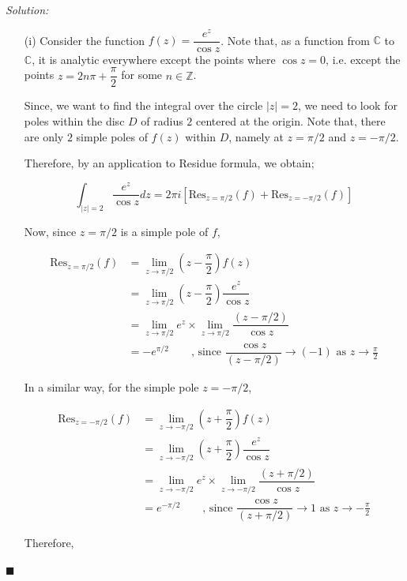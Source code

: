 \documentclass[12pt]{article}
\newcommand{\C}{\mathbb{C}}
\newcommand{\Z}{\mathbb{Z}}
\newcommand{\res}{\text{Res}}
\theoremstyle{definition}
\newenvironment{answer}{\textit{Solution: }\quad }{ \hfill $\blacksquare$}
\numberwithin{equation}{section}
\begin{document}
\begin{answer}
	\begin{enumerate}
		\item[(i)] Consider the function $f(z) = \dfrac{e^z}{\cos z}$. Note that, as a function from $\C$ to $\C$, it is analytic everywhere except the points where $\cos z =0$, i.e. except the points $z = 2n\pi + \dfrac{\pi}{2}$ for some $n \in \Z$. 
		 
		Since, we want to find the integral over the circle $\vert z \vert = 2$, we need to look for poles within the disc $D$ of radius $2$ centered at the origin. Note that, there are only $2$ simple poles of $f(z)$ within $D$, namely at $z = \pi/2$ and $z = -\pi/2$.
		
		Therefore, by an application to Residue formula, we obtain;

		$$
		\int_{\vert z \vert = 2} \dfrac{e^z}{\cos z} dz = 2\pi i\left[\res_{z = \pi/2}(f) + \res_{z = -\pi/2}(f)\right]
		$$

		Now, since $z = \pi/2$ is a simple pole of $f$,

		\begin{align*}
			\res_{z = \pi/2}(f)
			& = \lim_{z \rightarrow \pi/2} \left( z - \dfrac{\pi}{2}\right) f(z)\\
			& = \lim_{z \rightarrow \pi/2} \left( z - \dfrac{\pi}{2}\right) \dfrac{e^z}{\cos z}\\
			& = \lim_{z \rightarrow \pi/2} e^z \times \lim_{z \rightarrow \pi/2} \dfrac{(z - \pi/2)}{\cos z}\\
			& = -e^{\pi/2} \qquad \text{, since } \dfrac{\cos z}{(z - \pi/2)} \rightarrow (-1) \text{ as } z \rightarrow \frac{\pi}{2}
		\end{align*}

		In a similar way, for the simple pole $z = -\pi/2$, 

		\begin{align*}
			\res_{z = -\pi/2}(f)
			& = \lim_{z \rightarrow -\pi/2} \left( z + \dfrac{\pi}{2}\right) f(z)\\
			& = \lim_{z \rightarrow -\pi/2} \left( z + \dfrac{\pi}{2}\right) \dfrac{e^z}{\cos z}\\
			& = \lim_{z \rightarrow -\pi/2} e^z \times \lim_{z \rightarrow -\pi/2} \dfrac{(z + \pi/2)}{\cos z}\\
			& = e^{-\pi/2} \qquad \text{, since } \dfrac{\cos z}{(z + \pi/2)} \rightarrow 1 \text{ as } z \rightarrow -\frac{\pi}{2}
		\end{align*}

		Therefore,


\end{enumerate}
\end{answer}
\end{document}

